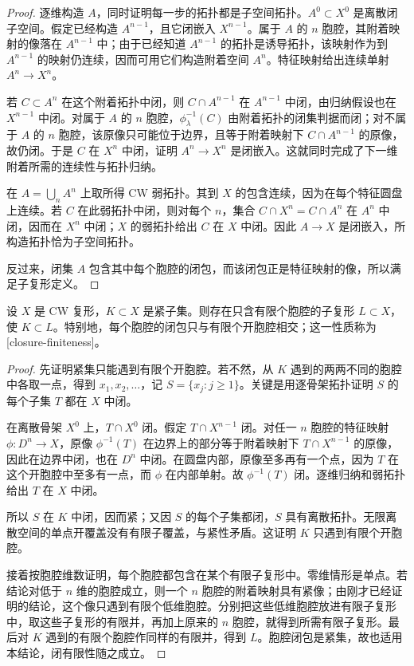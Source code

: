 \begin{proof}
	逐维构造 \(A\)，同时证明每一步的拓扑都是子空间拓扑。\(A^0\subset X^0\) 是离散闭子空间。假定已经构造 \(A^{n-1}\)，且它闭嵌入 \(X^{n-1}\)。属于 \(A\) 的 \(n\) 胞腔，其附着映射的像落在 \(A^{n-1}\) 中；由于已经知道 \(A^{n-1}\) 的拓扑是诱导拓扑，该映射作为到 \(A^{n-1}\) 的映射仍连续，因而可用它们构造附着空间 \(A^n\)。特征映射给出连续单射 \(A^n\to X^n\)。

	若 \(C\subset A^n\) 在这个附着拓扑中闭，则 \(C\cap A^{n-1}\) 在 \(A^{n-1}\) 中闭，由归纳假设也在 \(X^{n-1}\) 中闭。对属于 \(A\) 的 \(n\) 胞腔，\(\phi_\lambda^{-1}(C)\) 由附着拓扑的闭集判据而闭；对不属于 \(A\) 的 \(n\) 胞腔，该原像只可能位于边界，且等于附着映射下 \(C\cap A^{n-1}\) 的原像，故仍闭。于是 \(C\) 在 \(X^n\) 中闭，证明 \(A^n\to X^n\) 是闭嵌入。这就同时完成了下一维附着所需的连续性与拓扑归纳。

	在 \(A=\bigcup_n A^n\) 上取所得 CW 弱拓扑。其到 \(X\) 的包含连续，因为在每个特征圆盘上连续。若 \(C\) 在此弱拓扑中闭，则对每个 \(n\)，集合 \(C\cap X^n=C\cap A^n\) 在 \(A^n\) 中闭，因而在 \(X^n\) 中闭；\(X\) 的弱拓扑给出 \(C\) 在 \(X\) 中闭。因此 \(A\to X\) 是闭嵌入，所构造拓扑恰为子空间拓扑。

	反过来，闭集 \(A\) 包含其中每个胞腔的闭包，而该闭包正是特征映射的像，所以满足子复形定义。
\end{proof}

\begin{theorem}
	\label{g2:thm:finite-subcomplex}
	设 \(X\) 是 CW 复形，\(K\subset X\) 是紧子集。则存在只含有限个胞腔的子复形 \(L\subset X\)，使 \(K\subset L\)。特别地，每个胞腔的闭包只与有限个开胞腔相交；这一性质称为[closure-finiteness]。
\end{theorem}

\begin{proof}
	先证明紧集只能遇到有限个开胞腔。若不然，从 \(K\) 遇到的两两不同的胞腔中各取一点，得到 \(x_1,x_2,\ldots\)，记 \(S=\{x_j:j\geq1\}\)。关键是用逐骨架拓扑证明 \(S\) 的每个子集 \(T\) 都在 \(X\) 中闭。

	在离散骨架 \(X^0\) 上，\(T\cap X^0\) 闭。假定 \(T\cap X^{n-1}\) 闭。对任一 \(n\) 胞腔的特征映射 \(\phi:D^n\to X\)，原像 \(\phi^{-1}(T)\) 在边界上的部分等于附着映射下 \(T\cap X^{n-1}\) 的原像，因此在边界中闭，也在 \(D^n\) 中闭。在圆盘内部，原像至多再有一个点，因为 \(T\) 在这个开胞腔中至多有一点，而 \(\phi\) 在内部单射。故 \(\phi^{-1}(T)\) 闭。逐维归纳和弱拓扑给出 \(T\) 在 \(X\) 中闭。

	所以 \(S\) 在 \(K\) 中闭，因而紧；又因 \(S\) 的每个子集都闭，\(S\) 具有离散拓扑。无限离散空间的单点开覆盖没有有限子覆盖，与紧性矛盾。这证明 \(K\) 只遇到有限个开胞腔。

	接着按胞腔维数证明，每个胞腔都包含在某个有限子复形中。零维情形是单点。若结论对低于 \(n\) 维的胞腔成立，则一个 \(n\) 胞腔的附着映射具有紧像；由刚才已经证明的结论，这个像只遇到有限个低维胞腔。分别把这些低维胞腔放进有限子复形中，取这些子复形的有限并，再加上原来的 \(n\) 胞腔，就得到所需有限子复形。最后对 \(K\) 遇到的有限个胞腔作同样的有限并，得到 \(L\)。胞腔闭包是紧集，故也适用本结论，闭有限性随之成立。
\end{proof}

